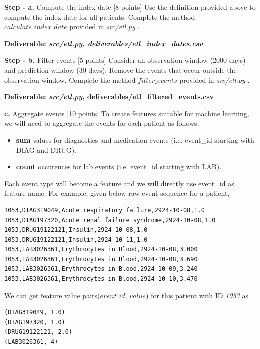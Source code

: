 \documentclass[12pt]{article}
\begin{document}
\textbf{Step - a.} Compute the index date [8 points]
\newline
Use the definition provided above to compute the index date for all patients. Complete the method \textit{$calculate\_index\_date$} provided in \textit{src/etl.py} . 
\newline

\textbf{Deliverable: \textit{src/etl.py, deliverables/etl\_index\_dates.csv}}
\newline

\textbf{Step - b.} Filter events [5 points]
\newline
Consider an observation window (2000 days) and prediction window (30 days).
Remove the events that occur outside the observation window. Complete the method \textit{$filter\_events$} provided in \textit{src/etl.py} . 
\newline

\textbf{Deliverable: \textit{src/etl.py}, deliverables/etl\_filtered\_events.csv}
\newline

\textbf{c.} Aggregate events [10 points]
\newline
To create features suitable for machine learning, we will need to aggregate the events for each patient as follows:
\begin{itemize}
\item \textbf{sum} values for diagnostics and medication events (i.e. event\_id starting with DIAG and DRUG).  
\item \textbf{count} occurences for lab events (i.e. event\_id starting with LAB). 
\end{itemize}

Each event type will become a feature and we will directly use event\_id as feature name. For example, given below raw event sequence for a patient, \\

\begin{lstlisting}[frame=single]
1053,DIAG319049,Acute respiratory failure,2924-10-08,1.0
1053,DIAG197320,Acute renal failure syndrome,2924-10-08,1.0
1053,DRUG19122121,Insulin,2924-10-08,1.0
1053,DRUG19122121,Insulin,2924-10-11,1.0
1053,LAB3026361,Erythrocytes in Blood,2924-10-08,3.000
1053,LAB3026361,Erythrocytes in Blood,2924-10-08,3.690
1053,LAB3026361,Erythrocytes in Blood,2924-10-09,3.240
1053,LAB3026361,Erythrocytes in Blood,2924-10-10,3.470
\end{lstlisting}

We can get feature value pairs($event\_id$, $value$) for this patient with ID \textit{1053} as \\
\begin{lstlisting}[frame=single]
(DIAG319049, 1.0)
(DIAG197320, 1.0)
(DRUG19122121, 2.0)
(LAB3026361, 4)
\end{lstlisting}
\end{document}
